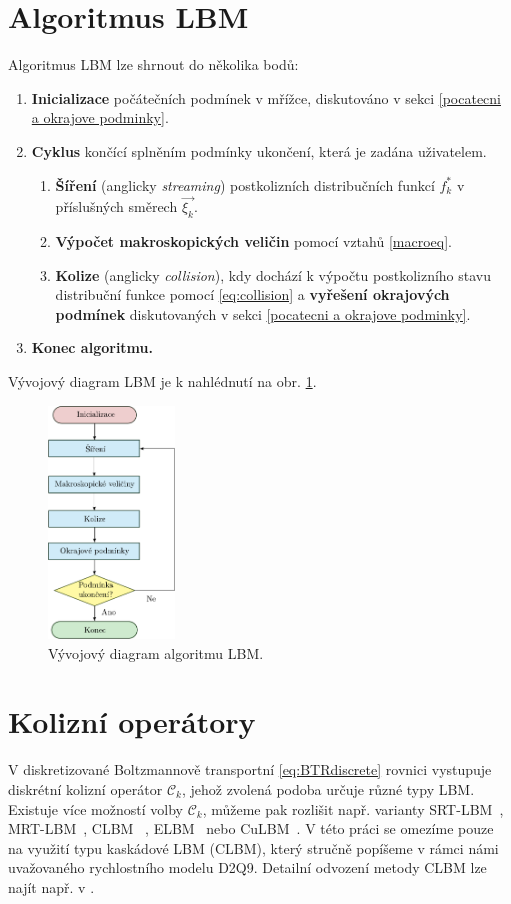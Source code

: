 \section{Algoritmus LBM}\label{algoritmus LBM}
Algoritmus LBM lze shrnout do několika bodů:
\begin{enumerate}
	\item \textbf{Inicializace} počátečních podmínek v mřížce, diskutováno v sekci \ref{pocatecni a okrajove podminky}.
	\item \textbf{Cyklus} končící splněním podmínky ukončení, která je zadána uživatelem.
	\begin{enumerate}
		\item \textbf{Šíření} (anglicky \textit{streaming}) postkolizních distribučních funkcí $ f^{*}_{k} $  v příslušných směrech $ \vec{\xi_{k}} $.
		\item \textbf{Výpočet makroskopických veličin} pomocí vztahů \eqref{macroeq}.
		\item \textbf{Kolize} (anglicky \textit{collision}), kdy dochází k výpočtu postkolizního stavu distribuční funkce pomocí \eqref{eq:collision} a \textbf{vyřešení okrajových podmínek} diskutovaných v sekci \ref{pocatecni a okrajove podminky}.
	\end{enumerate}
	\item \textbf{Konec algoritmu.}
\end{enumerate}
Vývojový diagram LBM je k nahlédnutí na obr. \ref{fig:algo}.
\begin{figure}[h]
	\centering
	\includegraphics[width=0.3\textwidth]{Images/algoritmus.pdf}
	\caption{Vývojový diagram algoritmu LBM.}
	\label{fig:algo}
\end{figure}


\section{Kolizní operátory}\label{kol}
V diskretizované Boltzmannově transportní \eqref{eq:BTRdiscrete} rovnici vystupuje diskrétní kolizní operátor $ \mathcal{C}_{k} $, jehož zvolená podoba určuje různé typy LBM. Existuje více možností volby  $ \mathcal{C}_{k} $, můžeme pak rozlišit např. varianty SRT-LBM~\cite{GeierCuLBM}, MRT-LBM~\cite{MRT}, CLBM~ \cite{GeierCLBM}, ELBM~\cite{ELBM} nebo CuLBM~\cite{GeierCuLBM}. V této práci se omezíme pouze na využití typu kaskádové LBM (CLBM), který stručně popíšeme v rámci námi uvažovaného rychlostního modelu D2Q9. Detailní odvození metody CLBM lze najít např. v \cite{GeierCLBM}.

